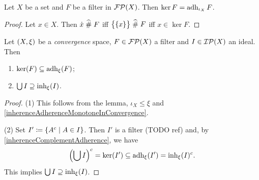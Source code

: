 \begin{lemma}
Let $X$ be a set and $F$ be a filter in $\operatorname{\mathcal{FP}}(X)$. Then $\ker F = \operatorname{adh}_{\iota_X} F$.
\end{lemma}
\begin{proof}
Let $x\in X$. Then $\dot{x} \mathrel{\widehat{\#}} F$ iff $\big\{\{x\}\big\} \mathrel{\widehat{\#}} F$ iff $x\in \ker F$.
\end{proof}
\begin{corollary} \label{kernelAdherence}
Let $\left( X,\xi \right)$ be a \emph{convergence} space, $F\in \operatorname{\mathcal{FP}}(X)$ a filter and $I\in\operatorname{\mathcal{IP}}(X)$ an ideal. Then
\begin{enumerate}
\item $\ker(F) \subseteq \operatorname{adh}_\xi(F)$;
\item $\bigcup I \supseteq \operatorname{inh}_\xi(I)$.
\end{enumerate}
\end{corollary}
\begin{proof}
(1) This follows from the lemma, $\iota_X \leq \xi$ and \ref{inherenceAdherenceMonotoneInConvergence}.

(2) Set $I' \defeq \setbuilder{A^c}{A\in I}$. Then $I'$ is a filter (TODO ref) and, by \ref{inherenceComplementAdherence}, we have
\[ \left(\bigcup I\right)^c = \ker(I') \subseteq  \operatorname{adh}_\xi(I') = \operatorname{inh}_\xi(I)^c. \]
This implies $\bigcup I \supseteq \operatorname{inh}_\xi(I)$.
\end{proof}

